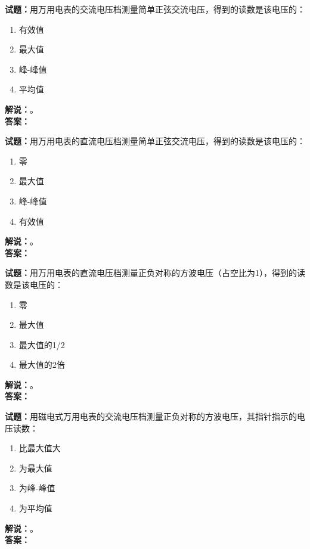 \documentclass{ctexbook}
\begin{document}
\bigskip

\noindent\textbf{试题：}用万用电表的交流电压档测量简单正弦交流电压，得到的读数是该电压的：
\begin{enumerate}[leftmargin=3em]
  \item 有效值
  \item 最大值
  \item 峰-峰值
  \item 平均值
\end{enumerate}
\noindent\textbf{解说：}\textbf{}。\\\noindent\textbf{答案：}

\bigskip

\noindent\textbf{试题：}用万用电表的直流电压档测量简单正弦交流电压，得到的读数是该电压的：
\begin{enumerate}[leftmargin=3em]
  \item 零
  \item 最大值
  \item 峰-峰值
  \item 有效值
\end{enumerate}
\noindent\textbf{解说：}\textbf{}。\\\noindent\textbf{答案：}

\bigskip

\noindent\textbf{试题：}用万用电表的直流电压档测量正负对称的方波电压（占空比为1），得到的读数是该电压的：
\begin{enumerate}[leftmargin=3em]
  \item 零
  \item 最大值
  \item 最大值的1/2
  \item 最大值的2倍
\end{enumerate}
\noindent\textbf{解说：}\textbf{}。\\\noindent\textbf{答案：}

\bigskip

\noindent\textbf{试题：}用磁电式万用电表的交流电压档测量正负对称的方波电压，其指针指示的电压读数：
\begin{enumerate}[leftmargin=3em]
  \item 比最大值大
  \item 为最大值
  \item 为峰-峰值
  \item 为平均值
\end{enumerate}
\noindent\textbf{解说：}\textbf{}。\\\noindent\textbf{答案：}

\bigskip
\end{document}
